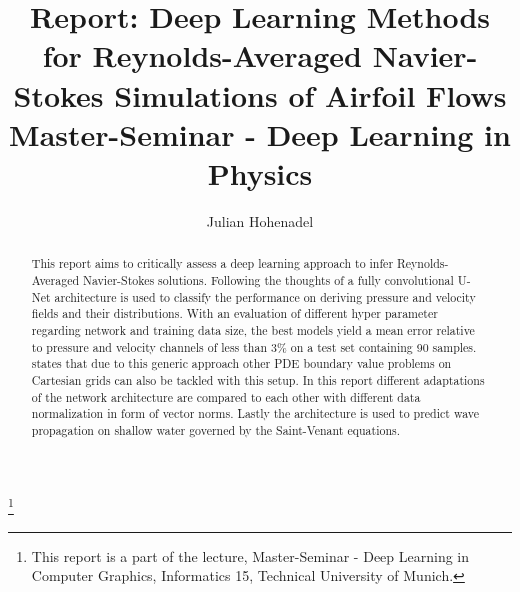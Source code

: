 \documentclass[acmtog]{techreportacmart}
\begin{document}
\title{Report: Deep Learning Methods for Reynolds-Averaged Navier-Stokes Simulations of
Airfoil Flows \\ Master-Seminar - Deep Learning in Physics} 
\author{Julian Hohenadel}

\renewcommand\shortauthors{Hohenadel}

\begin{abstract}
This report aims to critically assess a deep learning approach to infer Reynolds-Averaged Navier-Stokes 
solutions. Following the thoughts of \cite{Thuerey20} a fully convolutional U-Net architecture is used 
to classify the performance on deriving pressure and velocity fields and their distributions. With an 
evaluation of different hyper parameter regarding network and training data size, the best models yield 
a mean error relative to pressure and velocity channels of less than 3\% on a test set containing 90 
samples. \cite{Thuerey20} states that due to this generic approach other PDE boundary value problems 
on Cartesian grids can also be tackled with this setup. In this report different adaptations of the 
network architecture are compared to each other with different data normalization in form of vector 
norms. Lastly the architecture is used to predict wave propagation on shallow water governed by the 
Saint-Venant equations.
\end{abstract}

%
%



\thanks{This report is a part of the lecture, Master-Seminar - Deep Learning in
  Computer Graphics, Informatics 15, Technical University of Munich.}


\maketitle
\end{document}
